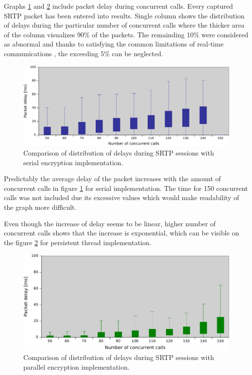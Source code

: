 Graphs \ref{serial-res} and \ref{pt-res} include packet delay
during concurrent calls. Every captured SRTP packet has been entered into
results. Single column shows the distribution of delays during the particular
number of concurrent calls where the thicker area of the column visualizes
90\% of the packets. The remainding 10\% were considered as abnormal and thanks
to satisfying the common limitations of real-time communications 
\cite{perkins:rtp2003}, the exceeding 5\% can be neglected.

\begin{figure}[H]
\centering
\includegraphics[width=15cm]{fig/serial-res.pdf}
\caption{Comparison of distribution of delays during SRTP sessions with serial 
encryption implementation.}
\label{serial-res}
\end{figure}

Predictably the average delay of the packet increases with the amount of 
concurrent calls in figure \ref{serial-res} for serial implementation. The time
for 150 concurrent calls was not included due its excessive values which would
make readability of the graph more difficult. 

Even though the increase of delay seems to be linear, higher number of 
concurrent calls shows that the increase is exponential, which can be visible
on the figure \ref{pt-res} for persistent thread implementation.

\begin{figure}[H]
\centering
\includegraphics[width=15cm]{fig/persistent-thread-res.pdf}
\caption{Comparison of distribution of delays during SRTP sessions with parallel 
encryption implementation.}
\label{pt-res}
\end{figure}


